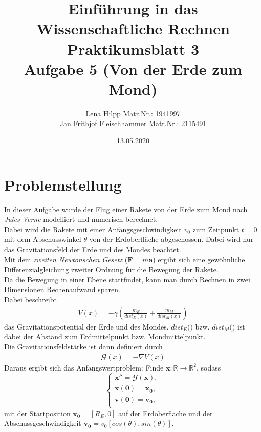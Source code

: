 \documentclass[11pt,a4paper]{article}
\title{Einf\"uhrung in das Wissenschaftliche Rechnen\\
  Praktikumsblatt 3\\
  Aufgabe 5 (Von der Erde zum Mond)}
\author{Lena Hilpp Matr.Nr.: 1941997\\Jan Frithjof Fleischhammer Matr.Nr.: 2115491}
\date{13.05.2020}
\begin{document}
  
  \maketitle
  
  \section*{Problemstellung}
  In dieser Aufgabe wurde der Flug einer Rakete von der Erde zum Mond nach \textit{Jules Verne} modelliert und numerisch berechnet.\\
  
  Dabei wird die Rakete mit einer Anfangsgeschwindigkeit $v_0$ zum Zeitpunkt $t=0$ mit dem Abschusswinkel $\theta$ von der Erdoberfl\"ache abgeschossen. Dabei wird nur das Gravitationsfeld der Erde und des Mondes beachtet.\\
  Mit dem \textit{zweiten Newtonschen Gesetz} ($\mathbf{F}=m \mathbf{a}$) ergibt sich eine gew\"ohnliche Differenzialgleichung zweiter Ordnung f\"ur die Bewegung der Rakete.\\
  Da die Bewegung in einer Ebene stattfindet, kann man durch Rechnen in zwei Dimensionen Rechenaufwand sparen.\\
  
  Dabei beschreibt
  \begin{align*}
  V(x)=-\gamma(\frac{m_E}{dist_E(x)}+\frac{m_M}{dist_M(x)})
\end{align*}    
 das Gravitationspotential der Erde und des Mondes. $dist_E(\dot)$ bzw. $dist_M(\dot)$ ist dabei der Abstand zum Erdmittelpunkt bzw. Mondmittelpunkt.\\
 
 Die Gravitationsfeldst\"arke ist dann definiert durch
 \begin{align*}
 \mathbfcal{G}(x)=-\nabla V(x)
 \end{align*}
Daraus ergibt sich das Anfangswertproblem: Finde $\mathbf{x}:\mathbb{R}\to{\mathbb{R}}^2$, sodass
\begin{equation}
\begin{cases}
\mathbf{x}'' = \mathbfcal{G}(\mathbf{x}), \\
\mathbf{x}(\mathbf{0}) = \mathbf{x_0}, \\
\mathbf{v}(\mathbf{0}) = \mathbf{v_0}, \\

\end{cases}
\end{equation}
mit der Startposition $\mathbf{x_0}=[R_E,0]$ auf der Erdoberfl\"ache und der Abschussgeschwindigkeit $\mathbf{v_0}=v_0[cos(\theta),sin(\theta)]$.
\end{document}
